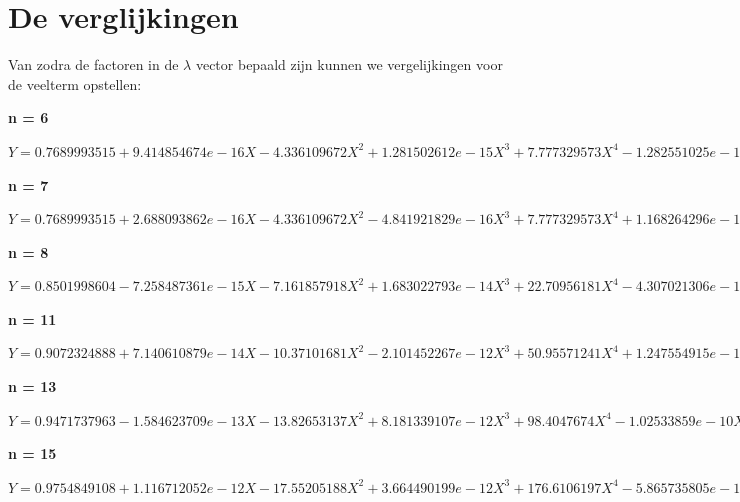 \documentclass[10pt,a4paper]{article}
\begin{document}
\section{De verglijkingen}
Van zodra de factoren in de $\lambda$ vector bepaald zijn kunnen we vergelijkingen voor de veelterm opstellen:
\begin{center}
\textbf{n = 6}
\end{center}
$Y = 0.7689993515  + 9.414854674e-16 X -4.336109672 X^{2}  + 1.281502612e-15 X^{3}  + 7.777329573 X^{4} -1.282551025e-15 X^{5} -4.196381387 X^{6} $
\begin{center}
\textbf{n = 7}
\end{center}
$Y = 0.7689993515  + 2.688093862e-16 X -4.336109672 X^{2} -4.841921829e-16 X^{3}  + 7.777329573 X^{4}  + 1.168264296e-15 X^{5} -4.196381387 X^{6} -1.184527236e-15 X^{7} $
\begin{center}
\textbf{n = 8}
\end{center}
$Y = 0.8501998604 -7.258487361e-15 X -7.161857918 X^{2}  + 1.683022793e-14 X^{3}  + 22.70956181 X^{4} -4.307021306e-15 X^{5} -28.9036082 X^{6} -1.385842305e-14 X^{7}  + 12.54970251 X^{8}  $
\begin{center}
\textbf{n = 11}
\end{center}
$Y = 0.9072324888  + 7.140610879e-14 X -10.37101681 X^{2} -2.101452267e-12 X^{3}  + 50.95571241 X^{4}  + 1.247554915e-11 X^{5} -114.269923 X^{6} -3.017527929e-11 X^{7}  + 116.0762224 X^{8}  + 3.187811671e-11 X^{9} -43.26056639 X^{10} -1.218867951e-11 X^{11} $
\begin{center}
\textbf{n = 13}
\end{center}
$Y = 0.9471737963 -1.584623709e-13 X -13.82653137 X^{2}  + 8.181339107e-12 X^{3}  + 98.4047674 X^{4} -1.02533859e-10 X^{5} -347.9856535 X^{6}  + 4.680857313e-10 X^{7}  + 626.8761862 X^{8} -9.684471789e-10 X^{9} -548.6596796 X^{10}  + 9.222148256e-10 X^{11}  + 184.2822627 X^{12} -3.274590204e-10 X^{13} $
\begin{center}
\textbf{n = 15}
\end{center}
$Y = 0.9754849108  + 1.116712052e-12 X -17.55205188 X^{2}  + 3.664490199e-12 X^{3}  + 176.6106197 X^{4} -5.865735805e-11 X^{5} -949.2311491 X^{6} -2.544832873e-10 X^{7}  + 2775.990946 X^{8}  + 2.826537973e-09 X^{9} -4398.964036 X^{10} -7.514213553e-09 X^{11}  + 3525.205695 X^{12}  + 8.033802204e-09 X^{13} -1112.997048 X^{14} -3.038144153e-09 X^{15} $
\end{document}
